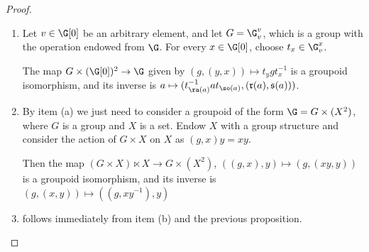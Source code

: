 \begin{proof}
\begin{enumerate}
\item[(a)] Let $v\in\G[0]$ be an arbitrary element, and let $G=\G_v^v$, which is a group with the operation endowed from $\G$. For every $x\in\G[0]$, choose $t_x\in\G_v^x$.%

The map $G\times(\G[0])^2\to\G$ given by $(g,(y,x))\mapsto t_yg t_x^{-1}$ is a groupoid isomorphism, and its inverse is $a\mapsto(t_{\ra(a)}^{-1}at_{\so(a)},(\mathfrak{r}(a),\mathfrak{s}(a)))$.

\item[(b)] By item (a) we just need to consider a groupoid of the form $\G=G\times(X^2)$, where $G$ is a group and $X$ is a set. Endow $X$ with a group structure and consider the action of $G\times X$ on $X$ as $(g,x)y=xy$.

Then the map $(G\times X)\ltimes X\to G\times(X^2)$, $((g,x),y)\mapsto(g,(xy,y))$ is a groupoid isomorphism, and its inverse is $(g,(x,y))\mapsto\left((g,xy^{-1}),y\right)$
\item[(c)] follows immediately from item (b) and the previous proposition.\qedhere
\end{enumerate}
\end{proof}


%
